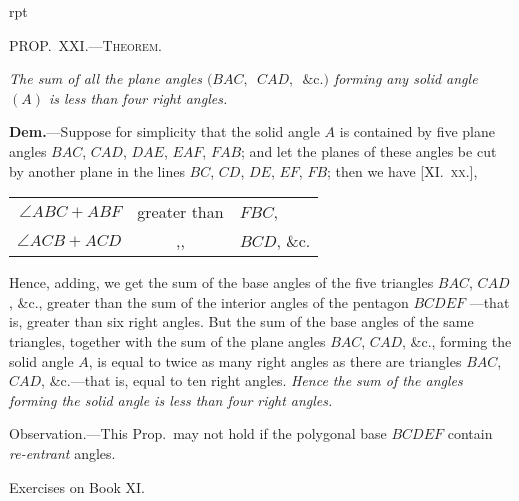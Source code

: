 \documentclass[oneside]{book}
\newcommand\mypropflot[5]{
\vspace{0.5\baselineskip}
\bigskip\Needspace*{4\baselineskip}
\setcounter{wrapwidth}{#3}
\begin{wrapfigure}[#4]{r}{\value{wrapwidth}pt}
\begin{center}
\vspace{-0.3in}
\end{center}
\end{wrapfigure}
\hspace{1.5\parindent}\textsc{#1}\par\medskip
\indent\emph{#2}\par\medskip
}
\newcommand\exhead[1]{
\Needspace*{5\baselineskip}\begin{center}
\textsf{#1}
\end{center}
}
\begin{document}
\mypropflot{PROP\@.~XXI\@.---Theorem.}{The sum of all the plane angles
$(BAC,$\ $CAD,$\ $\&\mathrm{c}.)$ forming
any solid angle $(A)$ is less than four right angles.}{128}{10}{f235}

\textbf{Dem.}---Suppose for simplicity that the solid angle $A$
is contained by five plane angles $BAC$, $CAD$, $DAE$,
$EAF$, $FAB$; and let the planes of these angles be cut
by another plane in the lines $BC$, $CD$, $DE$, $EF$, $FB$;
then we have [XI\@.~\textsc{xx.}],
\begin{center}
\begin{tabular}{r@{\ }c@{\ }l}
$\angle ABC + ABF$ & greater than & $FBC$, \\[1ex]
$\angle ACB + ACD$ &      ,,      & $BCD$, \&c.
\end{tabular}
\end{center}
Hence, adding, we get the sum
of the base angles of the five
triangles $BAC$, $CAD$, \&c.,
greater than the sum of the
interior angles of the pentagon
$BCDEF$ ---that is, greater than
six right angles. But the sum
of the base angles of the same
triangles, together with the
sum of the plane angles $BAC$,
$CAD$, \&c., forming the solid
angle $A$, is equal to twice as
many right angles as there are triangles $BAC$, $CAD$,
\&c.---that is, equal to ten right angles. \emph{Hence the sum
of the angles forming the solid angle is less than four
right angles.}

\smallskip
\begin{footnotesize}
\textsf{Observation.}---This Prop.\ may not hold if the polygonal base
$BCDEF$ contain \emph{re-entrant} angles.
\par\end{footnotesize}

\exhead{Exercises on Book XI\@.}
\end{document}
